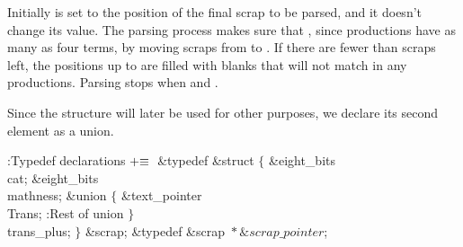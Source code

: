 \yskip\noindent Initially  is set to the position of the
final
scrap to be parsed, and it doesn't change its value. The parsing process
makes sure that , since productions have as
many as four terms,
by moving scraps from  to . If there are
fewer than  scraps left, the positions up to  are filled with
blanks that will not match in any productions. Parsing stops when
 and .

Since the  structure will later be used for other purposes, we
declare its second element as a union.

\Y\B\4:Typedef declarations\X${}\mathrel+\equiv{}$\6
\&{typedef} \&{struct} ${}\{{}$\1\6
\&{eight\_bits} \\{cat};\6
\&{eight\_bits} \\{mathness};\6
\&{union} ${}\{{}$\1\6
\&{text\_pointer} \\{Trans};\5
\hbox{}\6{}:Rest of  union\X\2\6
${}\}{}$ \\{trans\_plus};\2\6
${}\}{}$ \&{scrap};\6
\&{typedef} \&{scrap} ${}{*}\&{scrap\_pointer}{}$;\par
\fi

